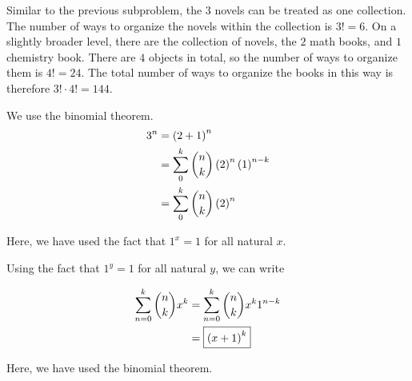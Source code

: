 \documentclass{article}
\begin{document}
\vspace{-4\parskip}
\subproblema{}
Similar to the previous subproblem, the $3$ novels can be treated as one collection.
The number of ways to organize the novels within the collection is $3! = 6$.
On a slightly broader level, there are the collection of novels, the $2$ math books, and $1$ chemistry book.
There are $4$ objects in total, so the number of ways to organize them is $4! = 24$.
The total number of ways to organize the books in this way is therefore $3! \cdot 4! = \boxed{144}$.

\setcounter{problem}{25}
\problem{}
\subproblema{}

We use the binomial theorem.
\begin{align*}
  3^n &= \left (2 + 1 \right)^n \\
      &= \sum \limits_{0}^{k} \binom{n}{k} \left (2 \right)^n \left (1 \right)^{n-k} \\
      &= \sum \limits_{0}^{k} \binom{n}{k} \left (2 \right)^n \\
\end{align*}

Here, we have used the fact that $1^x = 1$ for all natural $x$.

\vspace{-4\parskip}
\subproblema{}

Using the fact that $1^{y} = 1$ for all natural $y$, we can write

\begin{align*}
  \sum \limits_{n=0}^{k} \binom{n}{k} x^k &= \sum \limits_{n=0}^{k} \binom{n}{k} x^k 1^{n-k} \\
                                          &= \boxed{\left (x+1 \right)^k} \\
\end{align*}

Here, we have used the binomial theorem.
\end{document}
